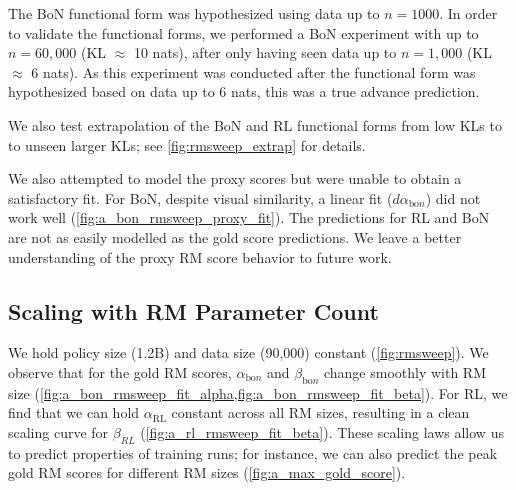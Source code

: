 \documentclass{article}
\theoremstyle{plain}
\begin{document}
The BoN functional form was hypothesized using data up to $n = 1000$. In order to validate the functional forms, we performed a BoN experiment with up to $n = 60,000$ (KL $\approx$ 10 nats), after only having seen data up to $n = 1,000$ (KL $\approx$ 6 nats). As this experiment was conducted after the functional form was hypothesized based on data up to 6 nats, this was a true advance prediction.

We also test extrapolation of the BoN and RL functional forms from low KLs to to unseen larger KLs; see \cref{fig:rmsweep_extrap} for details.



We also attempted to model the proxy scores but were unable to obtain a satisfactory fit. For BoN, despite visual similarity, a linear fit ($d\alpha_{\text{bo}n}$) did not work well (\cref{fig:a_bon_rmsweep_proxy_fit}). The predictions for RL and BoN are not as easily modelled as the gold score predictions. We leave a better understanding of the proxy RM score behavior to future work. 



















\subsection{Scaling with RM Parameter Count}\label{scaling_rm}

We hold policy size (1.2B) and data size (90,000) constant (\cref{fig:rmsweep}). We observe that for the gold RM scores, $\alpha_{\text{bo}n}$ and $\beta_{\text{bo}n}$ change smoothly with RM size (\cref{fig:a_bon_rmsweep_fit_alpha,fig:a_bon_rmsweep_fit_beta}). For RL, we find that we can hold $\alpha_{\text{RL}}$ constant across all RM sizes, resulting in a clean scaling curve for $\beta_{RL}$ (\cref{fig:a_rl_rmsweep_fit_beta}). These scaling laws allow us to predict properties of training runs; for instance, we can also predict the peak gold RM scores for different RM sizes (\cref{fig:a_max_gold_score}). 
\end{document}
